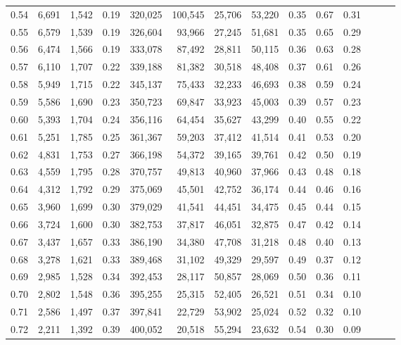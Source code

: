 \begin{tabular}{rrrrrrrrrrrrrr}
0.54 &  6,691 &  1,542 &  0.19 &  320,025 &  100,545 &  25,706 &  53,220 &  0.35 &  0.67 &      0.31 \\
0.55 &  6,579 &  1,539 &  0.19 &  326,604 &   93,966 &  27,245 &  51,681 &  0.35 &  0.65 &      0.29 \\
0.56 &  6,474 &  1,566 &  0.19 &  333,078 &   87,492 &  28,811 &  50,115 &  0.36 &  0.63 &      0.28 \\
0.57 &  6,110 &  1,707 &  0.22 &  339,188 &   81,382 &  30,518 &  48,408 &  0.37 &  0.61 &      0.26 \\
0.58 &  5,949 &  1,715 &  0.22 &  345,137 &   75,433 &  32,233 &  46,693 &  0.38 &  0.59 &      0.24 \\
0.59 &  5,586 &  1,690 &  0.23 &  350,723 &   69,847 &  33,923 &  45,003 &  0.39 &  0.57 &      0.23 \\
0.60 &  5,393 &  1,704 &  0.24 &  356,116 &   64,454 &  35,627 &  43,299 &  0.40 &  0.55 &      0.22 \\
0.61 &  5,251 &  1,785 &  0.25 &  361,367 &   59,203 &  37,412 &  41,514 &  0.41 &  0.53 &      0.20 \\
0.62 &  4,831 &  1,753 &  0.27 &  366,198 &   54,372 &  39,165 &  39,761 &  0.42 &  0.50 &      0.19 \\
0.63 &  4,559 &  1,795 &  0.28 &  370,757 &   49,813 &  40,960 &  37,966 &  0.43 &  0.48 &      0.18 \\
0.64 &  4,312 &  1,792 &  0.29 &  375,069 &   45,501 &  42,752 &  36,174 &  0.44 &  0.46 &      0.16 \\
0.65 &  3,960 &  1,699 &  0.30 &  379,029 &   41,541 &  44,451 &  34,475 &  0.45 &  0.44 &      0.15 \\
0.66 &  3,724 &  1,600 &  0.30 &  382,753 &   37,817 &  46,051 &  32,875 &  0.47 &  0.42 &      0.14 \\
0.67 &  3,437 &  1,657 &  0.33 &  386,190 &   34,380 &  47,708 &  31,218 &  0.48 &  0.40 &      0.13 \\
0.68 &  3,278 &  1,621 &  0.33 &  389,468 &   31,102 &  49,329 &  29,597 &  0.49 &  0.37 &      0.12 \\
0.69 &  2,985 &  1,528 &  0.34 &  392,453 &   28,117 &  50,857 &  28,069 &  0.50 &  0.36 &      0.11 \\
0.70 &  2,802 &  1,548 &  0.36 &  395,255 &   25,315 &  52,405 &  26,521 &  0.51 &  0.34 &      0.10 \\
0.71 &  2,586 &  1,497 &  0.37 &  397,841 &   22,729 &  53,902 &  25,024 &  0.52 &  0.32 &      0.10 \\
0.72 &  2,211 &  1,392 &  0.39 &  400,052 &   20,518 &  55,294 &  23,632 &  0.54 &  0.30 &      0.09 \\

\end{tabular}
